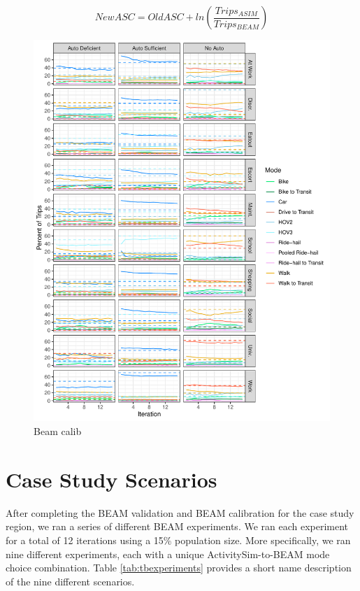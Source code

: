 \documentclass[fancy, masters]{byuthesis}
\begin{document}
\begin{equation}
  NewASC = OldASC + ln(\frac{Trips_{ASIM}}{Trips_{BEAM}}) \label{eq:eqcalib}
\end{equation}

\begin{figure}
\centering
\includegraphics{thesis_files/figure-latex/fig-beam-calib-1.pdf}
\caption{\label{fig:fig-beam-calib}Beam calib}
\end{figure}

\hypertarget{meth-scenarios}{%
\section{Case Study Scenarios}\label{meth-scenarios}}

After completing the BEAM validation and BEAM calibration for the case study region, we ran a series of different BEAM experiments. We ran each experiment for a total of 12 iterations using a 15\% population size. More specifically, we ran nine different experiments, each with a unique ActivitySim-to-BEAM mode choice combination. Table \ref{tab:tbexperiments} provides a short name description of the nine different scenarios.
\end{document}
